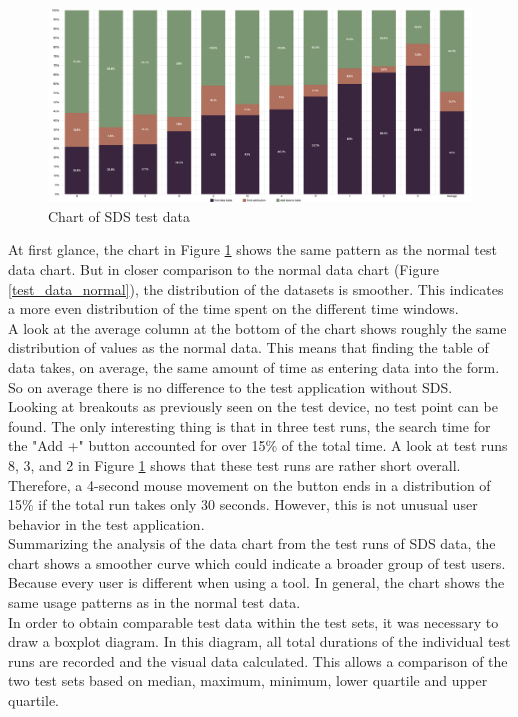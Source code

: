 \begin{figure}[htbp]
    \centerline{
    \includegraphics[width=\linewidth]{images/sds_test_data_chart.png}}
\caption{Chart of \ac{SDS} test data}
\label{test_data_sds}
\end{figure}
At first glance, the chart in Figure \ref{test_data_sds} shows the same pattern as the normal test data chart. But in closer comparison to the normal data chart (Figure \ref{test_data_normal}), the distribution of the datasets is smoother. This indicates a more even distribution of the time spent on the different time windows. \\
A look at the average column at the bottom of the chart shows roughly the same distribution of values as the normal data. This means that finding the table of data takes, on average, the same amount of time as entering data into the form. So on average there is no difference to the test application without \ac{SDS}. \\
Looking at breakouts as previously seen on the test device, no test point can be found. The only interesting thing is that in three test runs, the search time for the "Add +" button accounted for over 15\% of the total time. A look at test runs 8, 3, and 2 in Figure \ref{test_data_sds} shows that these test runs are rather short overall. Therefore, a 4-second mouse movement on the button ends in a distribution of 15\% if the total run takes only 30 seconds. However, this is not unusual user behavior in the test application.\\
Summarizing the analysis of the data chart from the test runs of SDS data, the chart shows a smoother curve which could indicate a broader group of test users. Because every user is different when using a tool. In general, the chart shows the same usage patterns as in the normal test data. \\

In order to obtain comparable test data within the test sets, it was necessary to draw a boxplot diagram. In this diagram, all total durations of the individual test runs are recorded and the visual data calculated. This allows a comparison of the two test sets based on median, maximum, minimum, lower quartile and upper quartile.\\

